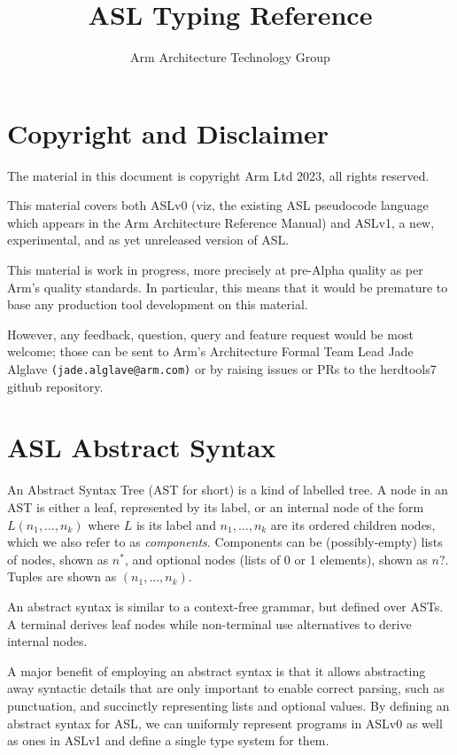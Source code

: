 \documentclass{book}
\author{Arm Architecture Technology Group}
\title{ASL Typing Reference}
\begin{document}
\maketitle

\tableofcontents{}

\chapter{Copyright and Disclaimer}

The material in this document is copyright Arm Ltd 2023, all rights reserved.

This material covers both ASLv0 (viz, the existing ASL pseudocode language
which appears in the Arm Architecture Reference Manual) and ASLv1, a new,
experimental, and as yet unreleased version of ASL.

This material is work in progress, more precisely at pre-Alpha quality as
per Arm’s quality standards. In particular, this means that it would be
premature to base any production tool development on this material.

However, any feedback, question, query and feature request would be most
welcome; those can be sent to Arm’s Architecture Formal Team Lead Jade
Alglave \texttt{(jade.alglave@arm.com)} or by raising issues or PRs to the herdtools7
github repository.

\chapter{ASL Abstract Syntax}
An Abstract Syntax Tree (AST for short) is a kind of labelled tree. 
A node in an AST is either a leaf, represented by its label, or an internal node of the form $L(n_1,\ldots,n_k)$ where $L$ is its label and $n_1,\ldots,n_k$ are its ordered children nodes, which we also refer to as \emph{components}.
Components can be (possibly-empty) lists of nodes, shown as $n^{*}$, and optional nodes (lists of 0 or 1 elements), shown as $n?$. Tuples are shown as $(n_1,\ldots,n_k)$.

An abstract syntax is similar to a context-free grammar, but defined over ASTs. A terminal derives leaf nodes while non-terminal use alternatives to derive internal nodes.

A major benefit of employing an abstract syntax is that it allows abstracting away syntactic details that are only important to enable correct parsing, such as punctuation, and succinctly representing lists and optional values. By defining an abstract syntax for ASL, we can uniformly represent programs in ASLv0 as well as ones in ASLv1 and define a single type system for them.
\end{document}
